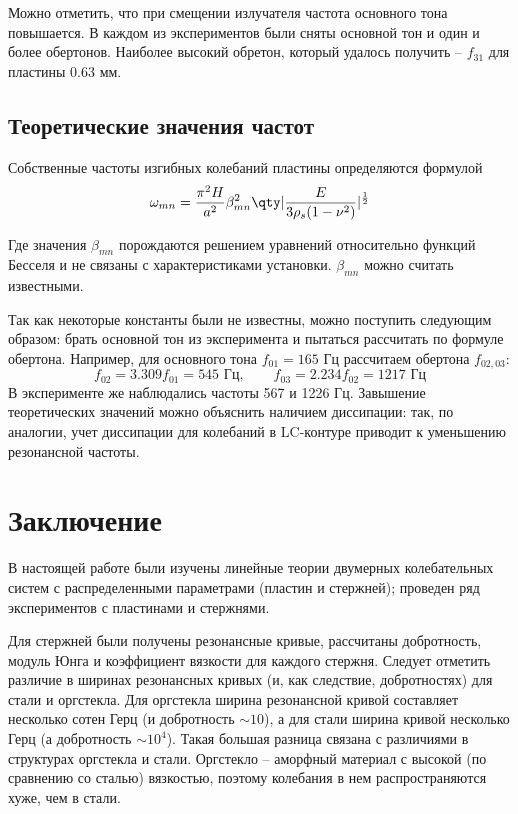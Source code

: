 Можно отметить, что при смещении излучателя частота основного тона повышается. В каждом из экспериментов были сняты основной тон и один и более обертонов. Наиболее высокий обретон, который удалось получить -- $f_{31}$ для пластины 0.63 мм.

\subsection{Теоретические значения частот}
Собственные частоты изгибных колебаний пластины определяются формулой
\begin{equation}
	\omega_{mn} = \frac{\pi^2 H}{a^2}\beta_{mn}^2 \qty|\frac{E}{3\rho_s (1-\nu^2)}|^{\frac12}
\end{equation}

Где значения $\beta_{mn}$ порождаются решением уравнений относительно функций Бесселя и не связаны с характеристиками установки. $\beta_{mn}$ можно считать известными.

Так как некоторые константы были не известны, можно поступить следующим образом: брать основной тон из эксперимента и пытаться рассчитать по формуле обертона. Например, для основного тона $f_{01}=165$ Гц рассчитаем обертона $f_{02,03}$:
\begin{equation}
	f_{02} = 3.309 f_{01} = 545 \text{ Гц},\qquad 
	f_{03} = 2.234 f_{02} = 1217 \text{ Гц} 
\end{equation}
В эксперименте же наблюдались частоты 567 и 1226 Гц. Завышение теоретических значений можно объяснить наличием диссипации: так, по аналогии, учет диссипации для колебаний в LC-контуре приводит к уменьшению резонансной частоты.
\newpage
{}
\section*{Заключение}
В настоящей работе были изучены линейные теории двумерных колебательных систем с распределенными параметрами (пластин и стержней); проведен ряд экспериментов с пластинами и стержнями. 

Для стержней были получены резонансные кривые, рассчитаны добротность, модуль Юнга и коэффициент вязкости для каждого стержня. Следует отметить различие в ширинах резонансных кривых (и, как следствие, добротностях) для стали и оргстекла. Для оргстекла ширина резонансной кривой составляет несколько сотен Герц (и добротность $\sim10$), а для стали ширина кривой несколько Герц (а добротность $\sim 10^4$). Такая большая разница связана с различиями в структурах оргстекла и стали. Оргстекло -- аморфный материал с высокой (по сравнению со сталью) вязкостью, поэтому колебания в нем распространяются хуже, чем в стали. 

